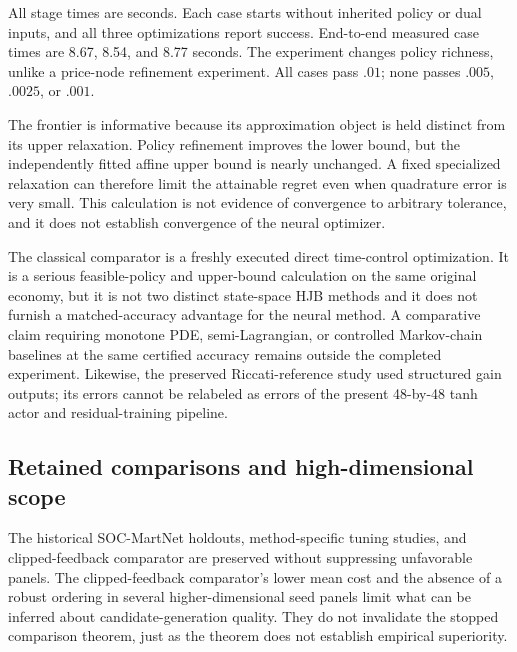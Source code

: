 \begin{table}[t]\centering\small
\caption{Fresh generation and independent verification as policy richness increases}\label{tab:frontier}

\par\smallskip\footnotesize All stage times are seconds. Each case starts without inherited policy or dual inputs, and all three optimizations report success. End-to-end measured case times are 8.67, 8.54, and 8.77 seconds. The experiment changes policy richness, unlike a price-node refinement experiment. All cases pass $.01$; none passes $.005$, $.0025$, or $.001$.
\end{table}

The frontier is informative because its approximation object is held distinct from its upper relaxation. Policy refinement improves the lower bound, but the independently fitted affine upper bound is nearly unchanged. A fixed specialized relaxation can therefore limit the attainable regret even when quadrature error is very small. This calculation is not evidence of convergence to arbitrary tolerance, and it does not establish convergence of the neural optimizer.

The classical comparator is a freshly executed direct time-control optimization. It is a serious feasible-policy and upper-bound calculation on the same original economy, but it is not two distinct state-space HJB methods and it does not furnish a matched-accuracy advantage for the neural method. A comparative claim requiring monotone PDE, semi-Lagrangian, or controlled Markov-chain baselines at the same certified accuracy remains outside the completed experiment. Likewise, the preserved Riccati-reference study used structured gain outputs; its errors cannot be relabeled as errors of the present 48-by-48 tanh actor and residual-training pipeline.

\subsection{Retained comparisons and high-dimensional scope}
The historical SOC-MartNet holdouts, method-specific tuning studies, and clipped-feedback comparator are preserved without suppressing unfavorable panels. The clipped-feedback comparator's lower mean cost and the absence of a robust ordering in several higher-dimensional seed panels limit what can be inferred about candidate-generation quality. They do not invalidate the stopped comparison theorem, just as the theorem does not establish empirical superiority.

